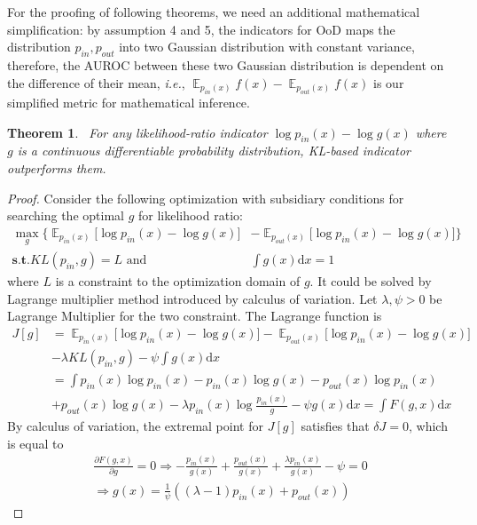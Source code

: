 \documentclass[a3paper]{article}
\newtheorem{theorem}{Theorem}
\newtheorem*{proof}{\it{Proof.}\rm}
\newcommand{\IE}{\textit{i.e.}, }
\newcommand{\dd}{\mathrm{d}}
\newcommand{\E}{\operatorname{\mathbb{E}}}
\newcommand{\pin}{p_{in}}
\newcommand{\pout}{p_{out}}
\begin{document}
For the proofing of following theorems, we need an additional mathematical simplification: by assumption 4 and 5, the indicators for OoD maps the distribution $\pin, \pout$ into two Gaussian distribution with constant variance, therefore, the AUROC between these two Gaussian distribution is dependent on the difference of their mean, \IE $\E_{\pin(x)} f(x) - \E_{\pout(x)} f(x)$ is our simplified metric for mathematical inference. 



\begin{theorem}~\label{thm4}
For any likelihood-ratio indicator $\log \pin(x) - \log g(x)$ where $g$ is a continuous differentiable probability distribution, KL-based indicator outperforms them.
\end{theorem}
\begin{proof}\rm
	Consider the following optimization with subsidiary conditions for searching the optimal $g$ for likelihood ratio:
	\begin{align*}
	\max_g \Big\{\E_{\pin(x)} \big[\log \pin(x) - \log g(x)\big] &- \E_{\pout(x)} \big[\log \pin(x) - \log g(x)\big]\Big\} \\
	\textbf{s.t.} KL(\pin, g) = L \text{ and } &\int g(x) \dd x = 1 
	\end{align*}
	where $L$ is a constraint to the optimization domain of $g$. It could be solved by Lagrange multiplier method introduced by calculus of variation. 
	Let $\lambda, \psi > 0$ be Lagrange Multiplier for the two constraint. The Lagrange function is 
	\begin{align*}
		J[g] &= \E_{\pin(x)} \big[\log \pin(x) - \log g(x)\big] - \E_{\pout(x)} \big[\log \pin(x) - \log g(x)\big] \\
		&-\lambda KL(\pin, g) - \psi \int g(x) \dd x \\
		&= \int \pin(x) \log \pin(x) - \pin(x) \log g(x) - \pout(x) \log \pin(x) \\ 
		&+ \pout(x) \log g(x) - \lambda \pin(x) \log \frac{\pin(x)}{g} - \psi g(x) \dd x = \int F(g, x) \dd x
	\end{align*}
	By calculus of variation, the extremal point for $J[g]$ satisfies that $\delta J = 0$, which is equal to
	\begin{align*}
		\frac{\partial F(g, x)}{\partial g} = 0 \Rightarrow -\frac{\pin(x)}{g(x)} + \frac{\pout(x)}{g(x)} + \frac{\lambda \pin(x)}{g(x)} - \psi = 0 \\
		\Rightarrow g(x) = \frac{1}{\psi} ((\lambda - 1)\pin(x) + \pout(x))
	\end{align*}

\end{proof}
\end{document}
